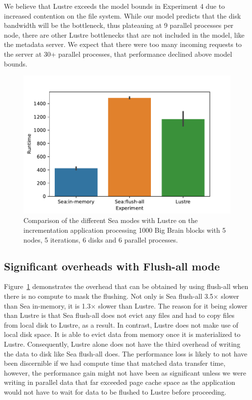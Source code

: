 \documentclass[10pt,journal,compsoc]{IEEEtran}
\begin{document}
      We believe that Lustre exceeds the model bounds in Experiment 4 due to
      increased contention on the file system. While our model predicts that the
      disk bandwidth will be the bottleneck, thus plateauing at 9 parallel
      processes per node, there are other Lustre bottlenecks that are not
      included in the model, like the metadata server. We expect that there were
      too many incoming requests to the server at 30+ parallel processes, that
      performance declined above model bounds. 
      

    \begin{figure}

        \centering
        \includegraphics{figures/flushall.pdf}%
        \caption{Comparison of the different Sea modes with Lustre on the
        incrementation application processing 1000 Big Brain blocks with 5
        nodes, 5 iterations, 6 disks and 6 parallel processes.}
    \label{fig:sea-comp:flush}
    \end{figure}

      \subsection{Significant overheads with Flush-all mode}

      Figure~\ref{fig:sea-comp:flush} demonstrates the overhead that can be
      obtained by using flush-all when there is no compute to mask the flushing.
      Not only is Sea flush-all 3.5$\times$ slower than Sea in-memory, it is
      1.3$\times$ slower than Lustre. The reason for it being slower than Lustre
      is that Sea flush-all does not evict any files and had to copy files from
      local disk to Lustre, as a result. In contrast, Lustre does not make use
      of local disk space. It is able to evict data from memory once it is
      materialized to Lustre. Consequently, Lustre alone does not have the third
      overhead of writing the data to disk like Sea flush-all does. The
      performance loss is likely to not have been discernible if we had compute
      time that matched data transfer time, however, the performance gain might
      not have been as significant unless we were writing in parallel data that
      far exceeded page cache space as the application would not have to wait
      for data to be flushed to Lustre before proceeding.
\end{document}
